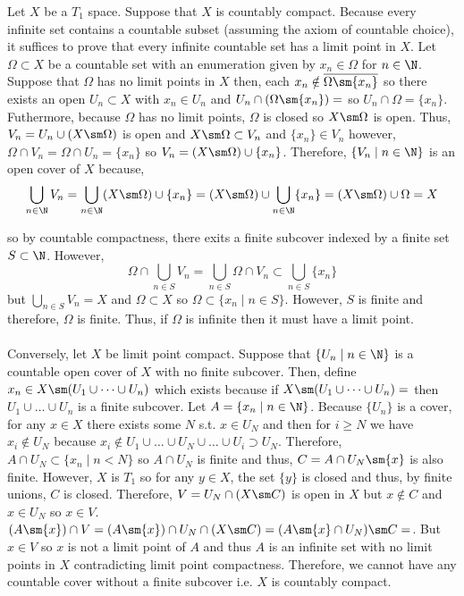 \documentclass[12pt]{extarticle}
\begin{document}
Let $X$ be a $T_1$ space. Suppose that $X$ is countably compact. Because every infinite set contains a countable subset (assuming the axiom of countable choice), it suffices to prove that every infinite countable set has a limit point in $X$. Let $\Omega \subset X$ be a countable set with an enumeration given by $x_n \in \Omega$ for $n \in \N$. Suppose that $\Omega$ has no limit points in $X$ then, each $x_n \notin \overline{\Omega \sm \{x_n\}}$ so there exists an open $U_n \subset X$ with $x_n \in U_n$ and $U_n \cap (\Omega \sm \{x_n\}) = \empty$ so $U_n \cap \Omega = \{x_n\}$. Futhermore, because $\Omega$ has no limit points, $\Omega$ is closed so $X \sm \Omega$ is open. Thus, $V_n = U_n \cup (X \sm \Omega)$ is open and $X \sm \Omega \subset V_n$ and $\{x_n\} \in V_n$ however, $\Omega \cap V_n = \Omega \cap U_n = \{x_n \}$ so $V_n = (X \sm \Omega) \cup \{x_n \}$. Therefore, $\{V_n \mid n \in \N \}$ is an open cover of $X$ because,
\[ \bigcup_{n \in \N} V_n = \bigcup_{n \in \N} (X \sm \Omega) \cup \{x_n \} = (X \sm \Omega) \cup  \bigcup_{n \in \N} \{x_n \} = (X \sm \Omega) \cup \Omega = X\]

so by countable compactness, there exits a finite subcover indexed by a finite set $S \subset \N$. However,
\[\Omega \cap \bigcup_{n \in S} V_n = \bigcup_{n \in S} \Omega \cap V_n \subset \bigcup_{n \in S} \{x_n\}\] 
but $\bigcup\limits_{n \in S} V_n  = X$ and $\Omega \subset X$ so $\Omega \subset \{x_n \mid n \in S\}$. However, $S$ is finite and therefore, $\Omega$ is finite. Thus, if $\Omega$ is infinite then it must have a limit point. \\\\
Conversely, let $X$ be limit point compact. Suppose that $\{U_n \mid n \in \N \}$ is a countable open cover of $X$ with no finite subcover. Then, define $x_n \in X \sm (U_1 \cup \dots \cup U_{n})$ which exists because if $X \sm (U_1 \cup \dots \cup U_n) = \empty$ then $U_1 \cup \dots \cup U_n$ is a finite subcover. Let $A = \{x_n \mid n \in \N\}$. Because $\{U_n\}$ is a cover, for any $x \in X$ there exists some $N$ s.t. $x \in U_{N}$ and then for $i \ge N$ we have $x_i \notin U_{N}$ because $x_i \notin U_1 \cup \dots \cup U_N \cup \dots \cup U_i \supset  U_N$. Therefore, $A \cap U_{N} \subset \{x_n \mid n < N\}$ so $A \cap U_{N}$ is finite and thus, $C = A \cap  U_{N} \sm \{x\}$ is also finite. However, $X$ is $T_1$ so for any $y \in X$, the set $\{y\}$ is closed and thus, by finite unions, $C$ is closed. Therefore, $V =  U_{N} \cap (X \sm C)$ is open in $X$ but $x \notin C$ and $x \in U_{N}$ so $x \in V$. $(A \sm \{x\}) \cap V = (A \sm \{x\}) \cap U_{N} \cap (X \sm C) = (A \sm \{x\} \cap U_N) \sm C = \empty$. But $x \in V$ so $x$ is not a limit point of $A$ and thus $A$ is an infinite set with no limit points in $X$ contradicting limit point compactness. Therefore, we cannot have any countable cover without a finite subcover i.e. $X$ is countably compact.     
\end{document}
